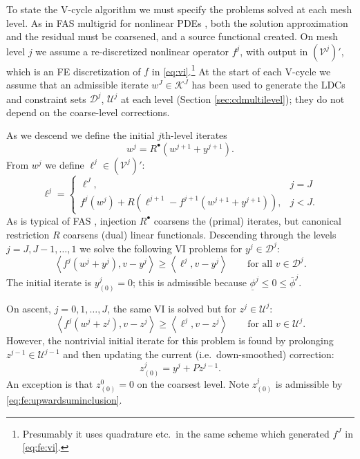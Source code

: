 \documentclass[review,hidelinks,onefignum,onetabnum]{siamart220329}
\newcommand{\cV}{\mathcal{V}}
\newcommand{\ip}[2]{\left<#1,#2\right>}
\newcommand{\iR}{R^{\bullet}}
\begin{document}
To state the V-cycle algorithm we must specify the problems solved at each mesh level.  As in FAS multigrid for nonlinear PDEs \cite{BrandtLivne2011,Bruneetal2015,Trottenbergetal2001}, both the solution approximation and the residual must be coarsened, and a source functional created.  On mesh level $j$ we assume a re-discretized nonlinear operator $f^j$, with output in $(\cV^j)'$, which is an FE discretization of $f$ in \eqref{eq:vi}.\footnote{Presumably it uses quadrature etc.~in the same scheme which generated $f^J$ in \eqref{eq:fe:vi}.}  At the start of each V-cycle we assume that an admissible iterate $w^J \in \mathcal{K}^J$ has been used to generate the LDCs and constraint sets $\mathcal{D}^j$, $\mathcal{U}^j$ at each level (Section \ref{sec:cdmultilevel}); they do not depend on the coarse-level corrections.

As we descend we define the initial $j$th-level iterates
\begin{equation}
w^j = \iR(w^{j+1} + y^{j+1}).  \label{eq:fe:definew}
\end{equation}
From $w^j$ we define $\ell^j \in (\cV^j)'$:
\begin{equation}
\ell^j = \begin{cases} \ell^J, & j=J \\
                       f^j(w^j) + R\left(\ell^{j+1}-f^{j+1}(w^{j+1}+y^{j+1})\right), & j<J. \end{cases} \label{eq:fe:levelsource}
\end{equation}
As is typical of FAS \cite[section 5.3]{Trottenbergetal2001}, injection $\iR$ coarsens the (primal) iterates, but canonical restriction $R$ coarsens (dual) linear functionals.  Descending through the levels $j=J,J-1,\dots,1$ we solve the following VI problems for $y^j \in \mathcal{D}^j$:
\begin{equation}
\ip{f^j(w^j + y^j)}{v-y^j} \ge \ip{\ell^j}{v-y^j} \qquad \text{for all } v\in \mathcal{D}^j. \label{eq:fe:downvi}
\end{equation}
The initial iterate is $y_{(0)}^j=0$; this is admissible because $\underline{\phi}^j \le 0 \le \overline{\phi}^j$.

On ascent, $j=0,1,\dots,J$, the same VI is solved but for $z^j \in \mathcal{U}^j$:
\begin{equation}
\ip{f^j(w^j + z^j)}{v-z^j} \ge \ip{\ell^j}{v-z^j} \qquad \text{for all } v\in \mathcal{U}^j. \label{eq:fe:upvi}
\end{equation}
However, the nontrivial initial iterate for this problem is found by prolonging $z^{j-1} \in \mathcal{U}^{j-1}$ and then updating the current (i.e.~down-smoothed) correction:
\begin{equation}
z_{(0)}^j = y^j + P z^{j-1}.  \label{eq:fe:upwardinitial}
\end{equation}
An exception is that $z_{(0)}^0=0$ on the coarsest level.  Note $z_{(0)}^j$ is admissible by \eqref{eq:fe:upwardsuminclusion}.
\end{document}
